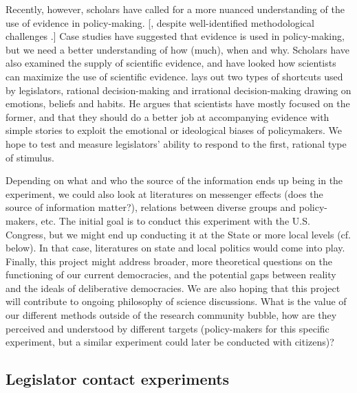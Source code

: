 \documentclass[12pt,final,fleqn]{article}
\theoremstyle{plain}
\begin{document}
Recently, however, scholars have called for a more nuanced understanding of the use of evidence in policy-making. [\citet{patashnik2016can}, despite well-identified methodological challenges \citep{mandell1984approaches}.] Case studies have suggested that evidence is used in policy-making, but we need a better understanding of how (much), when and why. Scholars have also examined the supply of scientific evidence, and have looked how scientists can maximize the use of scientific evidence. \citet{cairney2016politics} lays out two types of shortcuts used by legislators, rational decision-making and irrational decision-making drawing on emotions, beliefs and habits. He argues that scientists have mostly focused on the former, and that they should do a better job at accompanying evidence with simple stories to exploit the emotional or ideological biases of policymakers. We hope to test and measure legislators' ability to respond to the first, rational type of stimulus. 

Depending on what and who the source of the information ends up being in the experiment, we could also look at literatures on messenger effects (does the source of information matter?), relations between diverse groups and policy-makers, etc. The initial goal is to conduct this experiment with the U.S. Congress, but we might end up conducting it at the State or more local levels (cf. below). In that case, literatures on state and local politics would come into play. Finally, this project might address broader, more theoretical questions on the functioning of our current democracies, and the potential gaps between reality and the ideals of deliberative democracies. We are also hoping that this project will contribute to ongoing philosophy of science discussions. What is the value of our different methods outside of the research community bubble, how are they perceived and understood by different targets (policy-makers for this specific experiment, but a similar experiment could later be conducted with citizens)? 

\subsection{Legislator contact experiments}  \label{sec: contact experiments}
\end{document}
